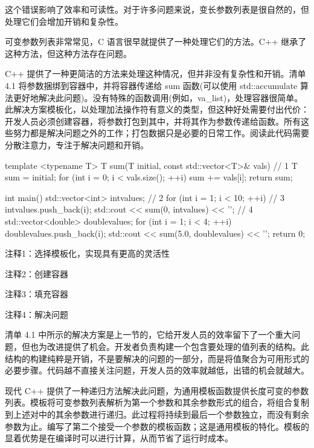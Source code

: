这个错误影响了效率和可读性。对于许多问题来说，变长参数列表是很自然的，但处理它们会增加开销和复杂性。


可变参数列表非常常见，C 语言很早就提供了一种处理它们的方法。C++ 继承了这种方法，但这种方法存在问题。

C++ 提供了一种更简洁的方法来处理这种情况，但并非没有复杂性和开销。清单 4.1 将参数捆绑到容器中，并将容器传递给 sum 函数(可以使用 std::accumulate 算法更好地解决此问题)。没有特殊的函数调用(例如，va\_list)，处理容器很简单。此解决方案模板化，以处理加法操作符有意义的类型，但这种好处需要付出代价：开发人员必须创建容器，将参数打包到其中，并将其作为参数传递给函数。所有这些努力都是解决问题之外的工作；打包数据只是必要的日常工作。阅读此代码需要分散注意力，专注于解决问题和开销。


\begin{cpp}
template <typename T>
T sum(T initial, const std::vector<T>& vals) { // 1
  T sum = initial;
  for (int i = 0; i < vals.size(); ++i)
    sum += vals[i];
  return sum;
}

int main() {
  std::vector<int> intvalues; // 2
  for (int i = 1; i < 10; ++i) // 3
    intvalues.push_back(i);
  std::cout << sum(0, intvalues) << '\n'; // 4
  std::vector<double> doublevalues;
  for (int i = 1; i < 4; ++i)
    doublevalues.push_back(i);
  std::cout << sum(5.0, doublevalues) << '\n';
  return 0;
}
\end{cpp}

{\footnotesize
注释1：选择模板化，实现具有更高的灵活性

注释2：创建容器

注释3：填充容器

注释4：解决问题
}


清单 4.1 中所示的解决方案是上一节的，它给开发人员的效率留下了一个重大问题，但也为改进提供了机会。开发者负责构建一个包含要处理的值列表的结构。此结构的构建纯粹是开销，不是要解决的问题的一部分，而是将值聚合为可用形式的必要步骤。代码越不直接关注问题，开发人员的效率就越低，出错的机会就越大。


现代 C++ 提供了一种递归方法解决此问题，为通用模板函数提供长度可变的参数列表。模板将可变参数列表解析为第一个参数和其余参数形式的组合，将组合复制到上述对中的其余参数进行递归。此过程将持续到最后一个参数独立，而没有剩余参数为止。编写了第二个接受一个参数的模板函数；这是通用模板的特化。模板的显着优势是在编译时可以进行计算，从而节省了运行时成本。


